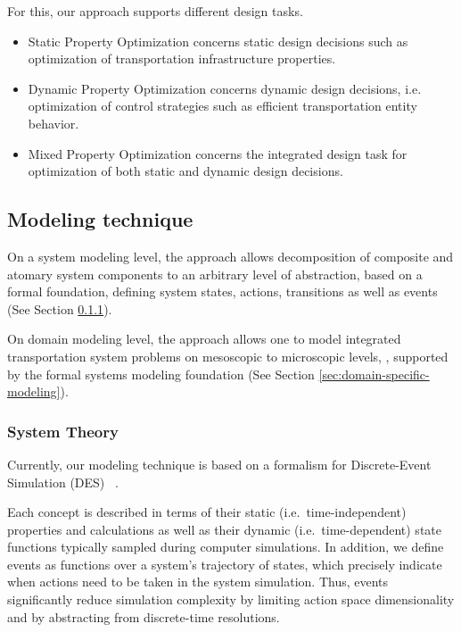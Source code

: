 \documentclass[10pt,twocolumn]{article}
\begin{document}
For this, our approach supports different design tasks. 

\begin{itemize}
\item Static Property Optimization concerns static design decisions such as optimization of transportation infrastructure properties.
\item Dynamic Property Optimization concerns dynamic design decisions, i.e. optimization of control strategies such as efficient transportation entity behavior.
\item Mixed Property Optimization concerns the integrated design task for optimization of both static and dynamic design decisions.
\end{itemize}

\subsection{Modeling technique}
\label{sec:modeling-technique}
On a system modeling level, the approach allows decomposition of composite and atomary system components to an arbitrary level of abstraction, based on a formal foundation, defining system states, actions, transitions as well as events (See Section \ref{sec:system-theory}).


On domain modeling level, the approach allows one to model integrated transportation system problems on mesoscopic to 
microscopic levels, \cite{ascher_hackenberg_2014, ascher_hackenberg_2015}, supported by the formal systems modeling foundation \cite{ascher_hackenberg_2016, ascher_hackenberg_2017} (See Section  \ref{sec:domain-specific-modeling}). 

\subsubsection{System Theory}
\label{sec:system-theory}

Currently, our modeling technique is based on a formalism for Discrete-Event Simulation (DES) ~\cite{fishman2001discrete}.

Each concept is described in terms of their static (i.e.\ time-independent) properties and calculations as well as their dynamic (i.e.\ time-dependent) state functions typically sampled during computer simulations. In addition, we define events as functions over a system's trajectory of states, which precisely indicate when actions need to be taken in the system simulation. Thus, events significantly reduce simulation complexity by limiting action space dimensionality and by abstracting from discrete-time resolutions. 
\end{document}
